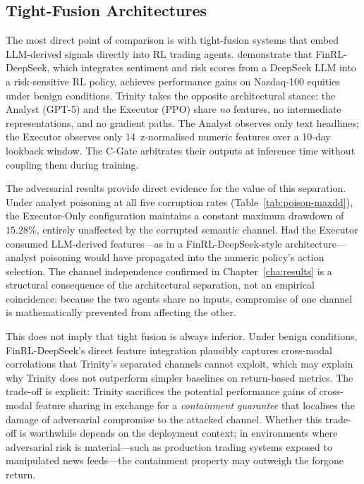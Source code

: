 \subsection{Tight-Fusion Architectures}
\label{sec:disc-tight-fusion}

The most direct point of comparison is with tight-fusion systems that embed
LLM-derived signals directly into RL trading agents.
\cite{benhenda2025finrl} demonstrate that FinRL-DeepSeek, which integrates
sentiment and risk scores from a DeepSeek LLM into a risk-sensitive RL policy,
achieves performance gains on Nasdaq-100 equities under benign conditions.
Trinity takes the opposite architectural stance: the Analyst (GPT-5) and the
Executor (PPO) share \emph{no} features, no intermediate representations, and
no gradient paths. The Analyst observes only text headlines; the Executor
observes only 14~z-normalised numeric features over a 10-day lookback window.
The C-Gate arbitrates their outputs at inference time without coupling them
during training.

The adversarial results provide direct evidence for the value of this
separation. Under analyst poisoning at all five corruption rates
(Table~\ref{tab:poison-maxdd}), the Executor-Only configuration maintains a
constant maximum drawdown of $15.28\%$, entirely unaffected by the corrupted
semantic channel. Had the Executor consumed LLM-derived features---as in a
FinRL-DeepSeek-style architecture---analyst poisoning would have propagated
into the numeric policy's action selection. The channel independence confirmed
in Chapter~\ref{cha:results} is a structural consequence of the architectural
separation, not an empirical coincidence: because the two agents share no
inputs, compromise of one channel is mathematically prevented from affecting
the other.

This does not imply that tight fusion is always inferior. Under benign
conditions, FinRL-DeepSeek's direct feature integration plausibly captures
cross-modal correlations that Trinity's separated channels cannot exploit,
which may explain why Trinity does not outperform simpler baselines on
return-based metrics. The trade-off is explicit: Trinity sacrifices the
potential performance gains of cross-modal feature sharing in exchange for a
\emph{containment guarantee} that localises the damage of adversarial
compromise to the attacked channel. Whether this trade-off is worthwhile
depends on the deployment context; in environments where adversarial risk is
material---such as production trading systems exposed to manipulated news
feeds---the containment property may outweigh the forgone return.

